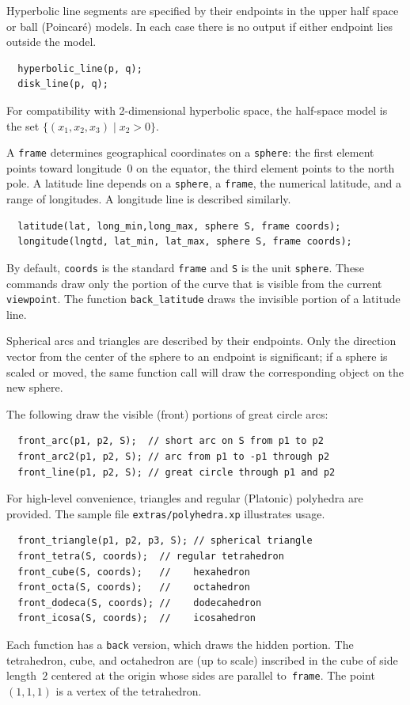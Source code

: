 \documentclass[12pt]{report}
\newcommand{\code}[1]{\texttt{#1}}
\newcommand{\filename}[1]{\texttt{#1}}
\begin{document}
Hyperbolic line segments are specified by their endpoints in the upper
half space or ball (Poincar\'e) models.  In each case there is no
output if either endpoint lies outside the model.
\begin{verbatim}
  hyperbolic_line(p, q);
  disk_line(p, q);
\end{verbatim}
For compatibility with 2-dimensional hyperbolic space, the half-space
model is the set $\{(x_1,x_2,x_3)\mid x_2>0\}$.

A \code{frame} determines geographical coordinates on a \code{sphere}:
the first element points toward longitude~0 on the equator, the third
element points to the north pole.  A latitude line depends on a
\code{sphere}, a \code{frame}, the numerical latitude, and a range of
longitudes. A longitude line is described similarly.
\begin{verbatim}
  latitude(lat, long_min,long_max, sphere S, frame coords);
  longitude(lngtd, lat_min, lat_max, sphere S, frame coords);
\end{verbatim}
By default, \code{coords} is the standard \code{frame} and \code{S} is
the unit \code{sphere}. These commands draw only the portion of the
curve that is visible from the current \code{viewpoint}. The function
\code{back\_latitude} draws the invisible portion of a latitude line.

Spherical arcs and triangles are described by their endpoints. Only
the direction vector from the center of the sphere to an endpoint is
significant; if a sphere is scaled or moved, the same function call
will draw the corresponding object on the new sphere. 

The following draw the visible (front) portions of great circle arcs:
\begin{verbatim}
  front_arc(p1, p2, S);  // short arc on S from p1 to p2
  front_arc2(p1, p2, S); // arc from p1 to -p1 through p2
  front_line(p1, p2, S); // great circle through p1 and p2
\end{verbatim}
For high-level convenience, triangles and regular (Platonic) polyhedra
are provided. The sample file \filename{extras/polyhedra.xp}
illustrates usage.
\begin{verbatim}
  front_triangle(p1, p2, p3, S); // spherical triangle
  front_tetra(S, coords);  // regular tetrahedron
  front_cube(S, coords);   //    hexahedron
  front_octa(S, coords);   //    octahedron
  front_dodeca(S, coords); //    dodecahedron
  front_icosa(S, coords);  //    icosahedron
\end{verbatim}
Each function has a \code{back} version, which draws the hidden
portion. The tetrahedron, cube, and octahedron are (up to scale)
inscribed in the cube of side length~$2$ centered at the origin whose
sides are parallel to~\code{frame}. The point $(1,1,1)$ is a vertex of
the tetrahedron.
\end{document}
